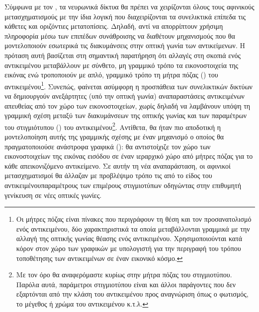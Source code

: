 Σύμφωνα με τον \cite{youtubeHinton}, τα νευρωνικά δίκτυα θα πρέπει να χειρίζονται όλους τους αφινικούς μετασχηματισμούς με την ίδια λογική που διαχειρίζονται τα συνελικτικά επίπεδα τις κάθετες και οριζόντιες μετατοπίσεις. Δηλαδή, αντί να απορρίπτουν χρήσιμη πληροφορία μέσω των επιπέδων συνάθροισης να διαθέτουν μηχανισμούς που θα μοντελοποιούν εσωτερικά τις διακυμάνσεις στην οπτική γωνία των αντικείμενων. Η πρόταση αυτή βασίζεται στη σημαντική παρατήρηση ότι αλλαγές στη σκοπιά ενός αντικειμένου μεταβάλλουν με σύνθετο, μη γραμμικό τρόπο τα εικονοστοιχεία της εικόνας ενώ τροποποιούν με απλό, γραμμικό τρόπο τη μήτρα πόζας () του αντικειμένου\footnote{Οι μήτρες πόζας είναι πίνακες που περιγράφουν τη θέση και τον προσανατολισμό ενός αντικειμένου, δύο χαρακτηριστικά τα οποία μεταβάλλονται γραμμικά με την αλλαγή της οπτικής γωνίας θέασης ενός αντικειμένου. Χρησιμοποιούνται κατά κόρον στον χώρο των γραφικών με υπολογιστή για την περιγραφή του τρόπου τοποθέτησης των αντικειμένων σε έναν εικονικό κόσμο.}. Συνεπώς, φαίνεται ασύμφορη η προσπάθεια των συνελικτικών δικτύων να δημιουργούν ανεξάρτητες (υπό την οπτική γωνία) αναπαραστάσεις αντικειμένων απευθείας από τον χώρο των εικονοστοιχείων, χωρίς δηλαδή να λαμβάνουν υπόψη τη γραμμική σχέση μεταξύ των διακυμάνσεων της οπτικής γωνίας και των παραμέτρων του στιγμιότυπου () του αντικειμένου\footnote{Με τον όρο  θα αναφερόμαστε κυρίως στην μήτρα πόζας του στιγμιοτύπου. Παρόλα αυτά, παράμετροι στιγμιοτύπου είναι και άλλοι παράγοντες που δεν εξαρτόνται από την κλάση του αντικειμένου προς αναγνώριση όπως ο φωτισμός, το μέγεθος ή χρώμα του αντικειμένου κ.τ.λ. }. Αντίθετα, θα ήταν πιο αποδοτική η μοντελοποίηση αυτής της γραμμικής σχέσης με έναν μηχανισμό ο οποίος θα πραγματοποιούσε ανάστροφα γραφικά (): θα αντιστοίχιζε τον χώρο των εικονοστοιχείων της εικόνας εισόδου σε έναν ιεραρχικό χώρο από μήτρες πόζας για το κάθε απεικονιζόμενο αντικείμενο. Σε αυτήν τη νέα αναπαράσταση, οι αφινικοί μετασχηματισμοί θα άλλαζαν με προβλέψιμο τρόπο τις  από το είδος του αντικειμένου\textemdash παραμέτρους των επιμέρους στιγμιοτύπων οδηγώντας στην επιθυμητή γενίκευση σε νέες οπτικές γωνίες.\par

